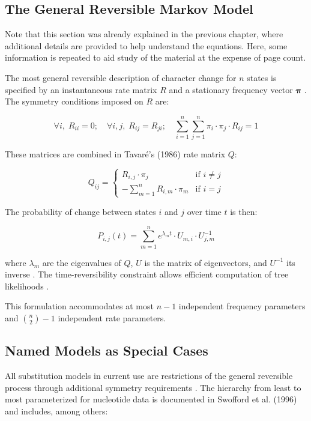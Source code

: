 \subsection{The General Reversible Markov Model}

Note that this section was already explained in the previous chapter, where additional details are provided to help understand the equations. Here, some information is repeated to aid study of the material at the expense of page count.

The most general reversible description of character change for $n$ states is specified by an instantaneous rate matrix $R$ and a stationary frequency vector $\symbf{\pi}$ \parencite{yang1994,tavare1986}. The symmetry conditions imposed on $R$ are:

$$\forall i,\; R_{ii} = 0; \quad \forall i,j,\; R_{ij} = R_{ji}; \quad \sum_{i=1}^{n}\sum_{j=1}^{n} \pi_i \cdot \pi_j \cdot R_{ij} = 1$$

These matrices are combined in Tavaré's (1986) rate matrix $Q$:

$$Q_{ij} = \begin{cases} R_{i,j} \cdot \pi_j & \text{if } i \neq j \\ -\sum_{m=1}^{n} R_{i,m} \cdot \pi_m & \text{if } i = j \end{cases}$$

The probability of change between states $i$ and $j$ over time $t$ is then:

$$P_{i,j}(t) = \sum_{m=1}^{n} e^{\lambda_m t} \cdot U_{m,i} \cdot U^{-1}_{j,m}$$

where $\lambda_m$ are the eigenvalues of $Q$, $U$ is the matrix of eigenvectors, and $U^{-1}$ its inverse \parencite{strang2006}. The time-reversibility constraint allows efficient computation of tree likelihoods \parencite{wheeler2012}.

This formulation accommodates at most $n-1$ independent frequency parameters and $\binom{n}{2} - 1$ independent rate parameters.

\subsection{Named Models as Special Cases}

All substitution models in current use are restrictions of the general reversible process through additional symmetry requirements \parencite{wheeler2012}. The hierarchy from least to most parameterized for nucleotide data is documented in Swofford et al. (1996) and includes, among others:

